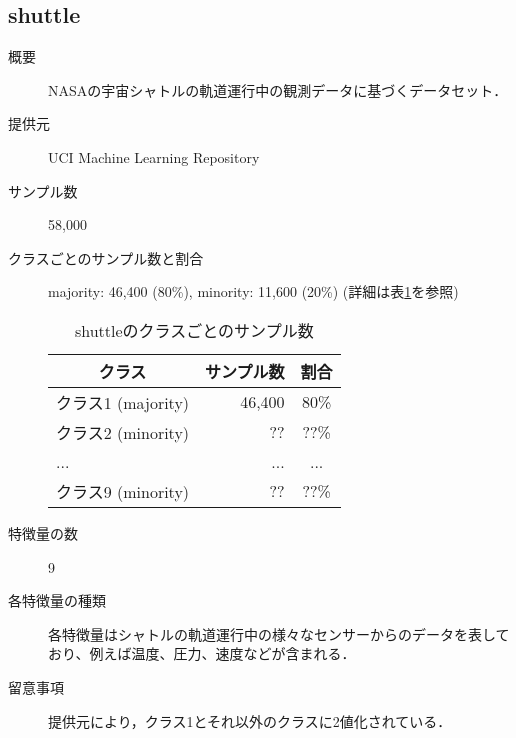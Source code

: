 \subsection{shuttle}
\begin{description}
    \item[概要] NASAの宇宙シャトルの軌道運行中の観測データに基づくデータセット．\cite{shuttle}
    \item[提供元] UCI Machine Learning Repository
    \item[サンプル数] 58,000
    \item[クラスごとのサンプル数と割合] majority: 46,400 (80\%), minority: 11,600 (20\%) (詳細は表\ref{tab:shuttle}を参照)

        \begin{table}[htbp]
            \centering
            \caption{shuttleのクラスごとのサンプル数}
            \label{tab:shuttle}
            \begin{tabular}{lrc} \hline
                \multicolumn{1}{c}{クラス}&
                \multicolumn{1}{c}{サンプル数}&
                \multicolumn{1}{c}{割合}\\
                \hline
                \hline
                クラス1 (majority)& 46,400 & 80\% \\
                クラス2 (minority)& ?? & ??\% \\
                ... & ... & ... \\
                クラス9 (minority)& ?? & ??\% \\
                \hline
            \end{tabular}
        \end{table}

    \item[特徴量の数] 9
    \item[各特徴量の種類] \mbox{}
        各特徴量はシャトルの軌道運行中の様々なセンサーからのデータを表しており、例えば温度、圧力、速度などが含まれる．
    \item[留意事項] 提供元により，クラス1とそれ以外のクラスに2値化されている．
\end{description}



